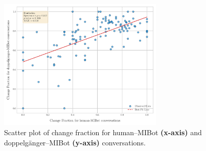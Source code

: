 \begin{figure}[ht!]
    \centering
    \includegraphics[width=0.7\textwidth]{fig/cf_doppelganger_human.pdf}
    \caption[Scatterplot of change fraction for humans and doppelgängers]{Scatter plot of change fraction for human--MIBot \textbf{(x-axis)} and doppelgänger--MIBot \textbf{(y-axis)} conversations.}
    \label{fig:cf_human_vs_doppel}
\end{figure}



